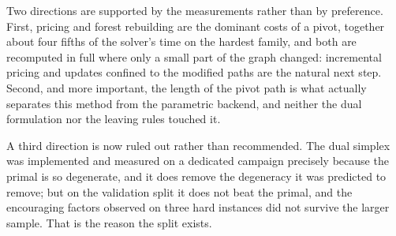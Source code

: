 Two directions are supported by the measurements rather than by preference.
First, pricing and forest rebuilding are the dominant costs of a pivot, together
about four fifths of the solver's time on the hardest family, and both are
recomputed in full where only a small part of the graph changed: incremental
pricing and updates confined to the modified paths are the natural next step.
Second, and more important, the length of the pivot path is what actually
separates this method from the parametric backend, and neither the dual
formulation nor the leaving rules touched it.

A third direction is now ruled out rather than recommended. The dual simplex was
implemented and measured on a dedicated campaign precisely because the primal is
so degenerate, and it does remove the degeneracy it was predicted to remove; but
on the validation split it does not beat the primal, and the encouraging factors
observed on three hard instances did not survive the larger sample. That is the
reason the split exists.
